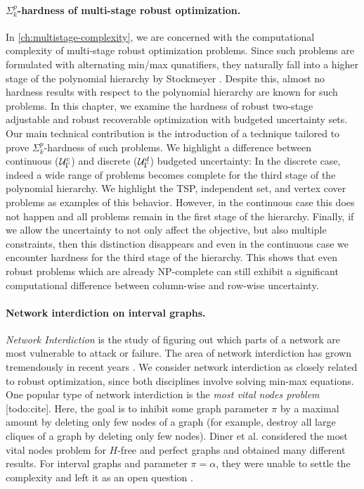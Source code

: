 \paragraph*{$\Sigma^p_k$-hardness of multi-stage robust optimization.}
In \cref{ch:multistage-complexity}, we are concerned with the computational complexity of multi-stage robust optimization problems. Since such problems are formulated with alternating min/max qunatifiers, they naturally fall into a higher stage of the polynomial hierarchy by Stockmeyer \cite{stockmeyer1976polynomial}. Despite this, almost no hardness results with respect to the polynomial hierarchy are known for such problems. In this chapter, we examine the hardness of robust two-stage adjustable and robust recoverable optimization with budgeted uncertainty sets. Our main technical contribution is the introduction of a technique tailored to prove $\Sigma^p_k$-hardness of such problems. We highlight a difference between continuous ($\mathcal{U}^c_\Gamma$) and discrete ($\mathcal{U}^d_\Gamma$) budgeted uncertainty: In the discrete case, indeed a wide range of problems becomes complete for the third stage of the polynomial hierarchy. We highlight the TSP, independent set, and vertex cover problems as examples of this behavior. However, in the continuous case this does not happen and all problems remain in the first stage of the hierarchy. Finally, if we allow the uncertainty to not only affect the objective, but also multiple constraints, then this distinction disappears and even in the continuous case we encounter hardness for the third stage of the hierarchy. This shows that even robust problems which are already NP-complete can still exhibit a significant computational difference between column-wise and row-wise uncertainty.

\paragraph*{Network interdiction on interval graphs.}
\emph{Network Interdiction} \cite{NetworkInterdictProblemsBookChapter} is the study of figuring out which parts of a network are most vulnerable to attack or failure. The area of network interdiction has grown tremendously in recent years \cite{criticalNodeDetectionSurvey}. 
We consider network interdiction as closely related to robust optimization, since both disciplines involve solving min-max equations. One popular type of network interdiction is the \emph{most vital nodes problem} [todo:cite]. Here, the goal is to inhibit some graph parameter $\pi$ by a maximal amount by deleting only few nodes of a graph (for example, destroy all large cliques of a graph by deleting only few nodes). Diner et al. \cite{diner2018contractionDeletionBlockers} considered the most vital nodes problem for $H$-free and perfect graphs and obtained many different results. For interval graphs and parameter $\pi = \alpha$, they were unable to settle the complexity and left it as an open question \cite[(Q2)]{diner2018contractionDeletionBlockers}.

